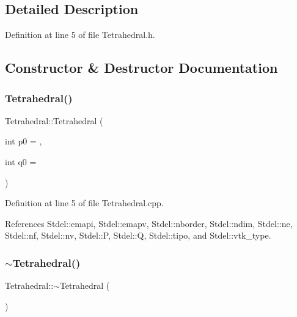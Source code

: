 \subsection{Detailed Description}


Definition at line 5 of file Tetrahedral.\+h.



\subsection{Constructor \& Destructor Documentation}
\mbox{\label{classTetrahedral_a3e935a037be9958f92e17deda1a721a8}} 
\subsubsection{\texorpdfstring{Tetrahedral()}{Tetrahedral()}}
{\footnotesize\ttfamily Tetrahedral\+::\+Tetrahedral (\begin{DoxyParamCaption}\item[{int}]{p0 = {},  }\item[{int}]{q0 = {} }\end{DoxyParamCaption})}



Definition at line 5 of file Tetrahedral.\+cpp.



References Stdel\+::emapi, Stdel\+::emapv, Stdel\+::nborder, Stdel\+::ndim, Stdel\+::ne, Stdel\+::nf, Stdel\+::nv, Stdel\+::P, Stdel\+::Q, Stdel\+::tipo, and Stdel\+::vtk\+\_\+type.

\mbox{\label{classTetrahedral_a81029f61fca381d618bf9ec26cffdf51}} 
\subsubsection{\texorpdfstring{$\sim$\+Tetrahedral()}{~Tetrahedral()}}
{\footnotesize\ttfamily Tetrahedral\+::$\sim$\+Tetrahedral (\begin{DoxyParamCaption}{ }\end{DoxyParamCaption})}



